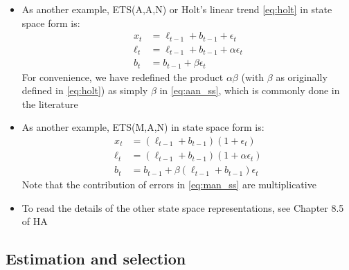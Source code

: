 \documentclass{article}
\begin{document}
\begin{itemize}
\item As another example, ETS(A,A,N) or Holt's linear trend \eqref{eq:holt} in 
  state space form is: 
  \begin{equation}
  \label{eq:aan_ss}
  \begin{aligned}
  x_t &= \ell_{t-1} + b_{t-1} + \epsilon_t \\
  \ell_t &= \ell_{t-1} + b_{t-1} + \alpha \epsilon_t \\
  b_t &= b_{t-1} + \beta \epsilon_t
  \end{aligned}
  \end{equation}
  For convenience, we have redefined the product $\alpha \beta$ (with $\beta$ as
  originally defined in \eqref{eq:holt}) as simply $\beta$ in \eqref{eq:aan_ss},
  which is commonly done in the literature  

\item As another example, ETS(M,A,N) in state space form is: 
  \begin{equation}
  \label{eq:man_ss}
  \begin{aligned}
  x_t &= (\ell_{t-1} + b_{t-1})(1 + \epsilon_t) \\
  \ell_t &= (\ell_{t-1} + b_{t-1})(1 + \alpha \epsilon_t) \\
  b_t &= b_{t-1} + \beta (\ell_{t-1} + b_{t-1}) \epsilon_t 
  \end{aligned}
  \end{equation}
  Note that the contribution of errors in \eqref{eq:man_ss} are multiplicative 

\item To read the details of the other state space representations, see Chapter 
  8.5 of HA
\end{itemize}

\subsection{Estimation and selection}
\end{document}
